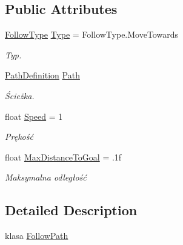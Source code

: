 \subsection*{Public Attributes}
\begin{DoxyCompactItemize}
\item 
\hypertarget{class_follow_path_a923cc736d703c012d1b6d8874291fa35}{}\hyperlink{class_follow_path_aa15222ed17c7bb53f199e5cb5e5c9cef}{Follow\+Type} \hyperlink{class_follow_path_a923cc736d703c012d1b6d8874291fa35}{Type} = Follow\+Type.\+Move\+Towards\label{class_follow_path_a923cc736d703c012d1b6d8874291fa35}

\begin{DoxyCompactList}\small\item\em Typ. \end{DoxyCompactList}\item 
\hypertarget{class_follow_path_a14f4aab3adc712c07ae9a02b87ffb2e3}{}\hyperlink{class_path_definition}{Path\+Definition} \hyperlink{class_follow_path_a14f4aab3adc712c07ae9a02b87ffb2e3}{Path}\label{class_follow_path_a14f4aab3adc712c07ae9a02b87ffb2e3}

\begin{DoxyCompactList}\small\item\em Ścieżka. \end{DoxyCompactList}\item 
\hypertarget{class_follow_path_a366b7ad38c7db477e1217ae5c364ac2b}{}float \hyperlink{class_follow_path_a366b7ad38c7db477e1217ae5c364ac2b}{Speed} = 1\label{class_follow_path_a366b7ad38c7db477e1217ae5c364ac2b}

\begin{DoxyCompactList}\small\item\em Prękość \end{DoxyCompactList}\item 
\hypertarget{class_follow_path_a7fd1ef16a8e77196e526d285197ed847}{}float \hyperlink{class_follow_path_a7fd1ef16a8e77196e526d285197ed847}{Max\+Distance\+To\+Goal} = .\+1f\label{class_follow_path_a7fd1ef16a8e77196e526d285197ed847}

\begin{DoxyCompactList}\small\item\em Maksymalna odległość \end{DoxyCompactList}\end{DoxyCompactItemize}


\subsection{Detailed Description}
klasa \hyperlink{class_follow_path}{Follow\+Path} 



